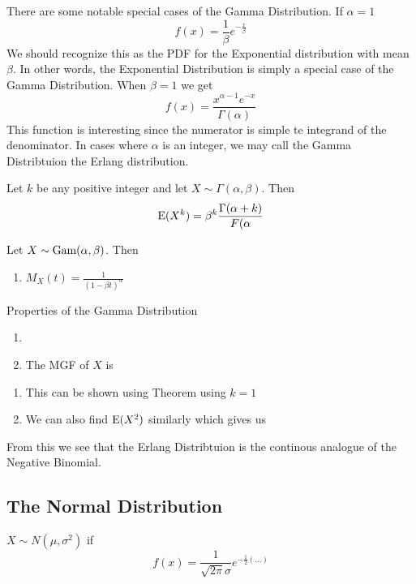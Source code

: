 \documentclass{report}
\begin{document}
There are some notable special cases of the Gamma Distribution. If $\alpha = 1 $
\[
    f(x)=\frac 1\beta e^{-\frac x \beta}
\]
We should recognize this as the PDF for the Exponential distribution with mean $\beta$. In other words, the Exponential Distribution is simply a special case of the Gamma Distribution. When $\beta=1$ we get
\[
    f(x)=\frac{x^{\alpha-1}e^{-x}}{\Gamma(\alpha)}
\]
This function is interesting since the numerator is simple te integrand of the denominator. In cases where $\alpha$ is an integer, we may call the Gamma Distribtuion the Erlang distribution.
\begin{theorem}
    Let $k$ be any positive integer and let $X\sim \Gamma(\alpha,\beta)$. Then
    \[
        \textup{E}(X^k)=\beta^k \frac{\Gamma(\alpha+k)}{F(\alpha}
    \]
    
\end{theorem}

\begin{theorem}
Let $X\sim\textup{Gam}(\alpha,\beta)$. Then
\begin{enumerate}
    \item $M_X(t)=\frac 1 {(1-\beta t)^\alpha}$
\end{enumerate}
    
\end{theorem}

\begin{theorem}
    {Properties of the Gamma Distribution}
    \begin{enumerate}
        \item[]
        \item The MGF of $X$ is 
    \end{enumerate}
    \begin{enumerate}
        \item This can be shown using Theorem \todo using $k=1$
        \item We can also find $\textup{E}(X^2)$ similarly which gives us
    \end{enumerate}
\end{theorem}

From this we see that the Erlang Distribtuion is the continous analogue of the Negative Binomial.



\subsection{The Normal Distribution}
$X\sim N(\mu,\sigma^2)$ if
\[
    f(x)=\frac 1 {\sqrt{2\pi}\sigma}e^{-\frac 12 (...)}
\]
\end{document}
